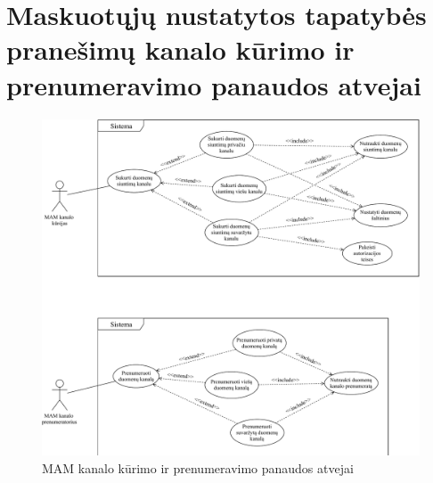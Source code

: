 \section{Maskuotųjų nustatytos tapatybės pranešimų kanalo kūrimo ir prenumeravimo panaudos atvejai}
\begin{figure}[H]
    \centering
    \includegraphics[scale=0.63]{images/ucd-1-2}
    \caption{MAM kanalo kūrimo ir prenumeravimo panaudos atvejai}
\end{figure}

